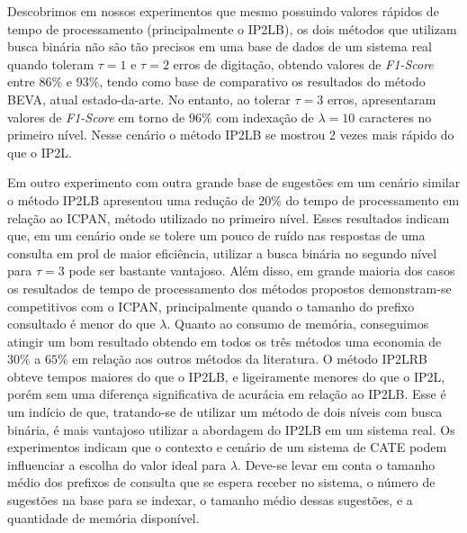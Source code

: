 Descobrimos em nossos experimentos que mesmo possuindo valores rápidos de tempo de processamento (principalmente o IP2LB), os dois métodos que utilizam busca binária não são tão precisos em uma base de dados de um sistema real quando toleram $\tau=1$ e $\tau=2$ erros de digitação, obtendo valores de \textit{F1-Score} entre $86\%$ e $93\%$, tendo como base de comparativo os resultados do método BEVA, atual estado-da-arte. No entanto, ao tolerar $\tau=3$ erros, apresentaram valores de \textit{F1-Score} em torno de $96\%$ com indexação de $\lambda=10$ caracteres no primeiro nível. Nesse cenário o método IP2LB se mostrou 2 vezes mais rápido do que o IP2L. 

Em outro experimento com outra grande base de sugestões em um cenário similar o método IP2LB apresentou uma redução de $20\%$ do tempo de processamento em relação ao ICPAN, método utilizado no primeiro nível. Esses resultados indicam que, em um cenário onde se tolere um pouco de ruído nas respostas de uma consulta em prol de maior eficiência, utilizar a busca binária no segundo nível para $\tau=3$ pode ser bastante vantajoso. Além disso, em grande maioria dos casos os resultados de tempo de processamento dos métodos propostos demonstram-se competitivos com o ICPAN, principalmente quando o tamanho do prefixo consultado é menor do que $\lambda$. Quanto ao consumo de memória, conseguimos atingir um bom resultado obtendo em todos os três métodos uma economia de $30\%$ a $65\%$ em relação aos outros métodos da literatura. O método IP2LRB obteve tempos maiores do que o IP2LB, e ligeiramente menores do que o IP2L, porém sem uma diferença significativa de acurácia em relação ao IP2LB. Esse é um indício de que, tratando-se de utilizar um método de dois níveis com busca binária, é mais vantajoso utilizar a abordagem do IP2LB em um sistema real. Os experimentos indicam que o contexto e cenário de um sistema de CATE podem influenciar a escolha do valor ideal para $\lambda$. Deve-se levar em conta o tamanho médio dos prefixos de consulta que se espera receber no sistema, o número de sugestões na base para se indexar, o tamanho médio dessas sugestões, e a quantidade de memória disponível. 

